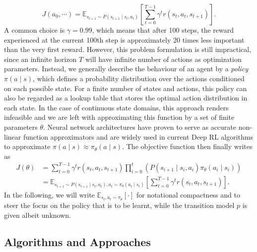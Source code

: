 \documentclass[a4paper, 11pt]{article}
\begin{document}
	\[J(a_0,\cdots)=\mathbb{E}_{s_{t+1}\sim P(s_{t+1}\mid s_t,a_t)}\left[\sum_{t=0}^{T-1}\gamma^t r(s_t,a_t,s_{t+1})\right].\] 
	A common choice is $\gamma=0.99$, which means that after 100 steps, the reward experienced at the current 100th step is approximately 20 times less important than the very first reward.
	However, this problem formulation is still impractical, since an infinite horizon $T$ will have infinite number of actions as optimization parameters. Instead, we generally describe the behaviour of an agent by a \textit{policy} $\pi(a\mid s)$, which defines a probability distribution over the actions conditioned on each possible state. 
	For a finite number of states and actions, this policy can also be regarded as a lookup table that stores the optimal action distribution in each state. In the case of continuous state domains, this approach renders infeasible and we are left with approximating this function by a set of finite parameters $\theta$.
	Neural network architectures have proven to serve as accurate non-linear function approximators and are widely used in current Deep RL algorithms to approximate $\pi(a\mid s)\approx \pi_\theta(a\mid s)$.
	The objective function then finally writes as
	\begin{align*}
		J(\theta)&=\sum_{t=0}^{T-1}\gamma^t r(s_t,a_t,s_{t+1})\prod_{i=0}^{t}\left(P(s_{i+1}\mid s_i,a_i)\pi_\theta(a_i\mid s_i)\right) \\
		&=\mathbb{E}_{s_{t+1}\sim P(s_{t+1}\mid s_t,a_t),a_t\sim \pi_\theta(a_t\mid s_t)}\left[\sum_{t=0}^{T-1}\gamma^t r(s_t,a_t,s_{t+1})\right].
	\end{align*}
	In the following, we will write $\mathbb{E}_{s_t,a_t\sim \pi_\theta}\left[\cdot \right]$ for notational compactness and to steer the focus on the policy that is to be learnt, while the transition model $p$ is given albeit unknown.
	\subsection{Algorithms and Approaches}
\end{document}
